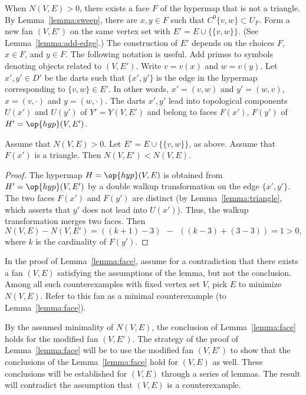 When $N(V,E)>0$,  there exists a face $F$ of the hypermap that is not a triangle.  By Lemma~\ref{lemma:sweep}, there are $x,y\in F$ such that $C^0\{v,w\}\subset U_F$. Form a new fan $(V,E')$ on the same vertex set with
$E' = E\cup \{\{v,w\}\}$.   (See Lemma~\ref{lemma:add-edge}.)  The construction of $E'$ depends on the choices $F$, $x\in F$, and $y\in F$.   The following notation is useful.  Add primes to symbols denoting objects related to $(V,E')$.  Write
$v=v(x)$ and $w=v(y)$.  Let $x',y'\in D'$ be the darts such that $\{x',y'\}$ is the edge in the hypermap corresponding to $\{v,w\}\in E'$.  In other words, $x'=(v,w)$ and $y'=(w,v)$, $x=(v,\cdot)$ and $y=(w,\cdot)$. The darts $x',y'$ lead into topological components $U(x')$ and $U(y')$ of $Y'=Y(V,E')$  and belong to faces $F(x')$, $F(y')$ of $H'=\op{hyp}(V,E')$.

\begin{lemma} 
Assume that $N(V,E)>0$.  Let $E'=E\cup \{\{v,w\}\}$, as above.  Assume that $F(x')$  is a triangle. Then $N(V,E')<N(V,E)$.
\end{lemma}


\begin{proof}    The hypermap $H=\op{hyp}(V,E)$ is obtained from $H'=\op{hyp}(V,E')$ by a double walkup transformation on the edge $\{x',y'\}$.    The two faces $F(x')$ and $F(y')$ are distinct (by Lemma~\ref{lemma:triangle}, which asserts that $y'$ does not lead into $U(x')$).  Thus, the walkup transformation merges two faces.   Then 
$$N(V,E) - N(V,E') = ((k+1)-3) ~~-~~ ((k-3) + (3-3)) = 1 >0,$$
where $k$ is the cardinality of $F(y')$.
\end{proof}

In the proof of Lemma~\ref{lemma:face},
assume for a contradiction that there exists a fan $(V,E)$ 
satisfying the assumptions of the lemma, but not the conclusion.
Among all such counterexamples with fixed vertex set $V$,  pick
$E$ to minimize  $N(V,E)$.  Refer to this fan as a minimal counterexample (to
Lemma~\ref{lemma:face}).  

By the assumed minimality of $N(V,E)$, the conclusion of Lemma~\ref{lemma:face} holds for the
modified fan $(V,E')$.  The strategy of the proof of Lemma~\ref{lemma:face} will
be to use the modified fan $(V,E')$ to show that the conclusions of the Lemma~\ref{lemma:face} hold for $(V,E)$ as well.   These conclusions will be established for $(V,E)$ through a series of lemmas.  The result will contradict the assumption that
$(V,E)$ is a counterexample.

